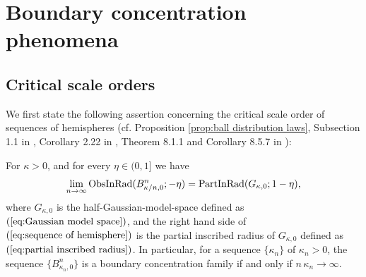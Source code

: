 \section{Boundary concentration phenomena}\label{sec:Boundary concentration phenomena}

\subsection{Critical scale orders}\label{sec:Sequences of model spaces}

We first state the following assertion concerning the critical scale order of sequences of hemispheres (cf. Proposition \ref{prop:ball distribution laws}, Subsection 1.1 in \cite{GM}, Corollary 2.22 in \cite{Sh}, Theorem 8.1.1 and Corollary 8.5.7 in \cite{Sh1}):
\begin{thm}\label{thm:sequence of hemisphere}
For $\kappa>0$,
and for every $\eta \in (0,1]$
we have
\begin{equation}\label{eq:sequence of hemisphere}
\lim_{n\to \infty}\operatorname{ObsInRad}(B^{n}_{\kappa/n,0};-\eta)= \operatorname{PartInRad}(G_{\kappa,0};1-\eta),
\end{equation}
where $G_{\kappa,0}$ is the half-Gaussian-model-space defined as $(\ref{eq:Gaussian model space})$,
and the right hand side of $(\ref{eq:sequence of hemisphere})$ is the partial inscribed radius of $G_{\kappa,0}$ defined as $(\ref{eq:partial inscribed radius})$.
In particular,
for a sequence $\{\kappa_{n}\}$ of $\kappa_{n}>0$,
the sequence $\{B^{n}_{\kappa_{n},0}\}$ is a boundary concentration family if and only if $n\,\kappa_{n}\to \infty$.
\end{thm}
